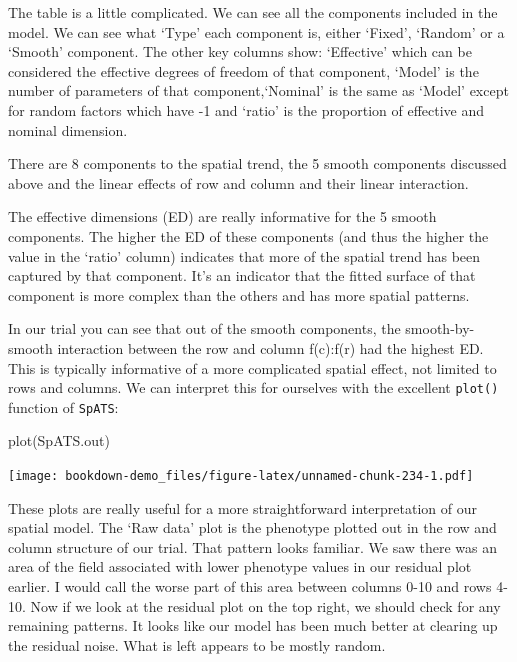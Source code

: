 \documentclass[
]{book}
\newenvironment{Shaded}{\begin{snugshade}}{\end{snugshade}}
\newcommand{\FunctionTok}[1]{\textcolor[rgb]{0.00,0.00,0.00}{#1}}
\newcommand{\NormalTok}[1]{#1}
\begin{document}
The table is a little complicated. We can see all the components included in the model. We can see what `Type' each component is, either `Fixed', `Random' or a `Smooth' component. The other key columns show: `Effective' which can be considered the effective degrees of freedom of that component, `Model' is the number of parameters of that component,`Nominal' is the same as `Model' except for random factors which have -1 and `ratio' is the proportion of effective and nominal dimension.

There are 8 components to the spatial trend, the 5 smooth components discussed above and the linear effects of row and column and their linear interaction.

The effective dimensions (ED) are really informative for the 5 smooth components. The higher the ED of these components (and thus the higher the value in the `ratio' column) indicates that more of the spatial trend has been captured by that component. It's an indicator that the fitted surface of that component is more complex than the others and has more spatial patterns.

In our trial you can see that out of the smooth components, the smooth-by-smooth interaction between the row and column f(c):f(r) had the highest ED. This is typically informative of a more complicated spatial effect, not limited to rows and columns. We can interpret this for ourselves with the excellent \texttt{plot()} function of \texttt{SpATS}:

\begin{Shaded}
\begin{Highlighting}[]
\FunctionTok{plot}\NormalTok{(SpATS.out)}
\end{Highlighting}
\end{Shaded}

\texttt{[image: bookdown-demo\_files/figure-latex/unnamed-chunk-234-1.pdf]}

These plots are really useful for a more straightforward interpretation of our spatial model. The `Raw data' plot is the phenotype plotted out in the row and column structure of our trial. That pattern looks familiar. We saw there was an area of the field associated with lower phenotype values in our residual plot earlier. I would call the worse part of this area between columns 0-10 and rows 4-10. Now if we look at the residual plot on the top right, we should check for any remaining patterns. It looks like our model has been much better at clearing up the residual noise. What is left appears to be mostly random.
\end{document}
